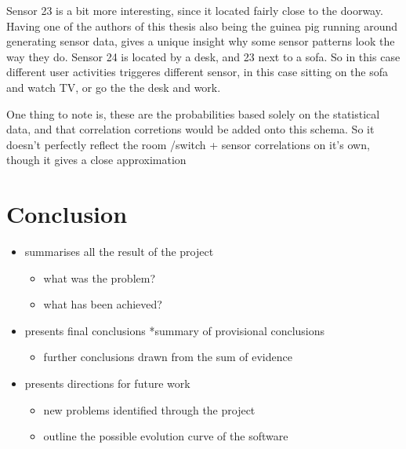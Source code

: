 Sensor 23 is a bit more interesting, since it located fairly close to the doorway. Having one of the authors of this thesis also being the guinea pig running around generating sensor data, gives a unique insight why some sensor patterns look the way they do. Sensor 24 is located by a desk, and 23 next to a sofa. So in this case different user activities triggeres different sensor, in this case sitting on the sofa and watch TV, or go the the desk and work. 

One thing to note is, these are the probabilities based solely on the statistical data, and that correlation corretions would be added onto this schema. So it doesn't perfectly reflect the room \slash  switch + sensor correlations on it's own, though it gives a close approximation

\chapter{Conclusion}
\label{conclusion}

\begin{itemize}
\item summarises all the result of the project

\begin{itemize}
\item what was the problem?

\item what has been achieved?

\end{itemize}

\item presents final conclusions
*summary of provisional conclusions

\begin{itemize}
\item further conclusions drawn from the sum of evidence

\end{itemize}

\item presents directions for future work

\begin{itemize}
\item new problems identified through the project

\item outline the possible evolution curve of the software

\end{itemize}

\end{itemize}

